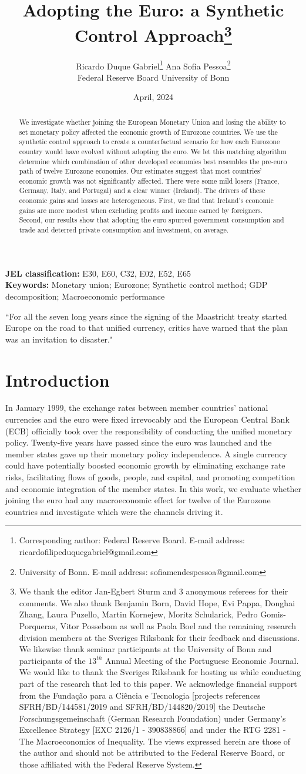 \documentclass[12pt]{article}
\title{Adopting the Euro: a Synthetic Control Approach\footnote{We thank the editor Jan-Egbert Sturm and 3 anonymous referees for their comments. We also thank Benjamin Born, David Hope, Evi Pappa, Donghai Zhang, Laura Puzello, Martin Kornejew, Moritz Schularick, Pedro Gomis-Porqueras, Vitor Possebom as well as Paola Boel and the remaining research division members at the Sveriges Riksbank for their feedback and discussions. We likewise thank seminar participants at the University of Bonn and participants of the $13^{th}$ Annual Meeting of the Portuguese Economic Journal. We would like to thank the Sveriges Riksbank for hosting us while conducting part of the research that led to this paper. We acknowledge financial support from the Fundação para a Ciência e Tecnologia [projects references SFRH/BD/144581/2019 and SFRH/BD/144820/2019] the Deutsche Forschungsgemeinschaft (German Research Foundation) under Germany's Excellence Strategy [EXC 2126/1 - 390838866] and under the RTG 2281 - The Macroeconomics of Inequality. The views expressed herein are those of the author and should not be attributed to the Federal Reserve Board, or those affiliated with the Federal Reserve System.}}
\author{\hspace{-2em} Ricardo Duque Gabriel\footnote{Corresponding author: Federal Reserve Board. E-mail address: ricardofilipeduquegabriel@gmail.com} \hspace{5em} Ana Sofia Pessoa\footnote{University of Bonn. E-mail address: sofiamendespessoa@gmail.com}\\ \hspace{-1em} Federal Reserve Board \hspace{5em} University of Bonn}
\date{April, 2024}
\begin{document}
\begin{titlepage}
\clearpage\thispagestyle{empty}
\maketitle
\thispagestyle{empty}
\vspace{-3em}
\begin{abstract}
We investigate whether joining the European Monetary Union and losing the ability to set monetary policy affected the economic growth of Eurozone countries. We use the synthetic control approach to create a counterfactual scenario for how each Eurozone country would have evolved without adopting the euro. We let this matching algorithm determine which combination of other developed economies best resembles the pre-euro path of twelve Eurozone economies. Our estimates suggest that most countries' economic growth was not significantly affected. There were some mild losers (France, Germany, Italy, and Portugal) and a clear winner (Ireland). The drivers of these economic gains and losses are heterogeneous. First, we find that Ireland's economic gains are more modest when excluding profits and income earned by foreigners. Second, our results show that adopting the euro spurred government consumption and trade and deterred private consumption and investment, on average. 
\end{abstract}

\vspace{1ex}
\textbf{JEL classification:} E30, E60, C32, E02, E52, E65 \\

\textbf{Keywords:}  Monetary union; Eurozone; Synthetic control method; GDP decomposition; Macroeconomic performance

\end{titlepage}

\clearpage

\doublespacing

\indent ``For all the seven long years since the signing of the Maastricht treaty started Europe on the road to that unified currency, critics have warned that the plan was an invitation to disaster." \cite{Krugman1998}

\section{Introduction}

In January 1999, the exchange rates between member countries’ national currencies and the euro were fixed irrevocably and the European Central Bank (ECB) officially took over the responsibility of conducting the unified monetary policy. Twenty-five years have passed since the euro was launched and the member states gave up their monetary policy independence. A single currency could have potentially boosted economic growth by eliminating exchange rate risks, facilitating flows of goods, people, and capital, and promoting competition and economic integration of the member states. In this work, we evaluate whether joining the euro had any macroeconomic effect for twelve of the Eurozone countries and investigate which were the channels driving it.
\end{document}

